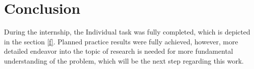 \documentclass[13pt, a4paper]{article}
\begin{document}
\section{Conclusion}

During the internship, the Individual task was fully completed, which is depicted in the section \ref{f}. Planned practice results were fully achieved, however, more detailed endeavor into the topic of research is needed for more fundamental understanding of the problem, which will be the next step regarding this work.

\newpage



{}

\end{document}
